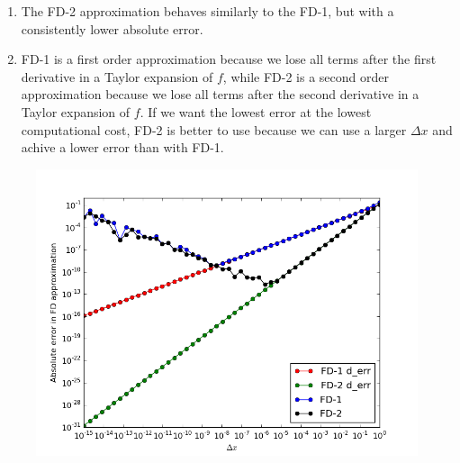 \documentclass[12pt, preprint]{aastex}
\begin{document}
\begin{enumerate}
    \item The FD-2 approximation behaves similarly to the FD-1, but with a consistently lower absolute error.


    \item  FD-1 is a first order approximation because we lose all terms after the first derivative in a Taylor expansion of $f$, while FD-2 is a second order approximation because we lose all terms after the second derivative in a Taylor expansion of $f$. If we want the lowest error at the lowest computational cost, FD-2 is better to use because we can use a larger $\Delta x$ and achive a lower error than with FD-1.


\end{enumerate}
\begin{figure}
  \centering
  \includegraphics[width=\textwidth]{hw1_fig1.png}
\end{figure}



\end{document}
